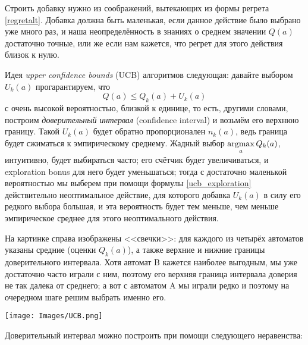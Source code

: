 Строить добавку нужно из соображений, вытекающих из формы регрета \eqref{regretalt}. Добавка должна быть маленькая, если данное действие было выбрано уже много раз, и наша неопределённость в знаниях о среднем значении $Q(a)$ достаточно точные, или же если нам кажется, что регрет для этого действия близок к нулю.

Идея \emph{upper confidence bounds} (UCB) алгоритмов следующая: давайте выбором $U_k(a)$ прогарантируем, что
$$Q(a) \le Q_k(a) + U_k(a)$$
с очень высокой вероятностью, близкой к единице, то есть, другими словами, построим \emph{доверительный интервал} (confidence interval) и возьмём его верхнюю границу. Такой $U_k(a)$ будет обратно пропорционален $n_k(a)$, ведь граница будет сжиматься к эмпирическому среднему. Жадный выбор $\mathop{\mathrm{argmax}}\limits_a Q_k(a)$, интуитивно, будет выбираться часто; его счётчик будет увеличиваться, и exploration bonus для него будет уменьшаться; тогда с достаточно маленькой вероятностью мы выберем при помощи формулы \eqref{ucb_exploration} действительно неоптимальное действие, для которого добавка $U_k(a)$ в силу его редкого выбора большая, и эта вероятность будет тем меньше, чем меньше эмпирическое среднее для этого неоптимального действия.

\begin{exampleBox}[righthand ratio=0.4, sidebyside, sidebyside align=center, lower separated=false]{}
На картинке справа изображены <<свечки>>: для каждого из четырёх автоматов указаны средние (оценки $Q_k(a)$), а также верхние и нижние границы доверительного интервала. Хотя автомат B кажется наиболее выгодным, мы уже достаточно часто играли с ним, поэтому его верхняя граница интервала доверия не так далека от среднего; а вот с автоматом A мы играли редко и поэтому на очередном шаге решим выбрать именно его.

\tcblower
\texttt{[image: Images/UCB.png]}
\end{exampleBox}

Доверительный интервал можно построить при помощи следующего неравенства:

